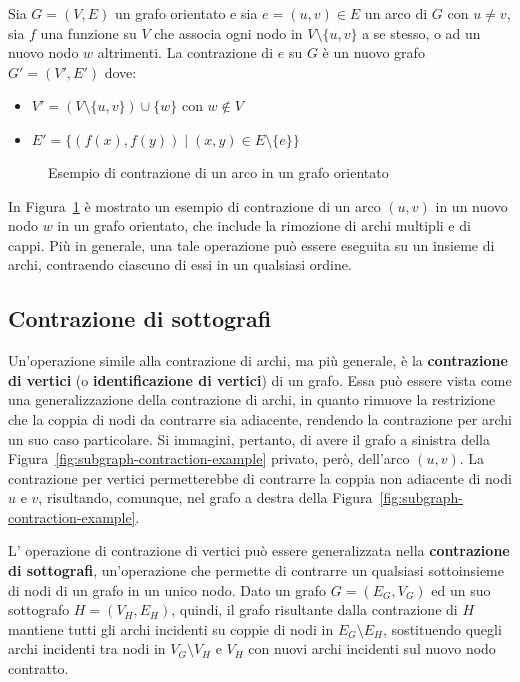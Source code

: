 \begin{definition}
Sia $G = (V, E)$ un grafo orientato e sia $e = (u, v) \in E$ un arco di $G$ con $u \neq v$,
sia $f$ una funzione su $V$ che associa ogni nodo in $V \setminus \{u, v\}$ a se stesso, o ad un nuovo nodo $w$
altrimenti. \newline
La contrazione di $e$ su $G$ \`e un nuovo grafo $G' = (V', E')$ dove:
\begin{itemize}
    \item $V' = (V \setminus \{u, v\}) \cup \{w\}$ con $w \notin V$
    \item $E' = \{(f(x), f(y)) \mid (x, y) \in E \setminus \{e\}\}$
\end{itemize}
\end{definition}

\begin{figure}[h]
    \centering
    
    \caption{Esempio di contrazione di un arco in un grafo orientato}
    \label{fig:edge-contraction-example}
\end{figure}

In Figura~\ref{fig:edge-contraction-example} \`e mostrato un esempio di contrazione di un arco $(u, v)$ in un nuovo
nodo $w$ in un grafo orientato, che include la rimozione di archi multipli e di cappi.
Pi\`u in generale, una tale operazione pu\`o essere eseguita su un insieme di archi, contraendo ciascuno di essi in
un qualsiasi ordine.

\subsection{Contrazione di sottografi}\label{subsec:contrazione-di-sottografi}
Un'operazione simile alla contrazione di archi, ma pi\`u generale, \`e la \textbf{contrazione di vertici}
(o \textbf{identificazione di vertici}) di un grafo.
Essa pu\`o essere vista come una generalizzazione della contrazione di archi, in quanto rimuove la restrizione che
la coppia di nodi da contrarre sia adiacente, rendendo la contrazione per archi un suo caso particolare.
Si immagini, pertanto, di avere il grafo a sinistra della Figura~\ref{fig:subgraph-contraction-example} privato,
per\`o, dell'arco $(u, v)$.
La contrazione per vertici permetterebbe di contrarre la coppia non adiacente di nodi $u$ e $v$, risultando,
comunque, nel grafo a destra della Figura~\ref{fig:subgraph-contraction-example}. \newline

L' operazione di contrazione di vertici pu\`o essere generalizzata nella \textbf{contrazione di sottografi},
un'operazione che permette di contrarre un qualsiasi sottoinsieme di nodi di un grafo in un unico nodo.
Dato un grafo $G = (E_G, V_G)$ ed un suo sottografo $H = (V_H, E_H)$, quindi, il grafo risultante dalla contrazione
di $H$ mantiene tutti gli archi incidenti su coppie di nodi in $E_G \setminus E_H$, sostituendo
quegli archi incidenti tra nodi in $V_G \setminus V_H$ e $V_H$ con nuovi archi incidenti sul nuovo nodo contratto.

